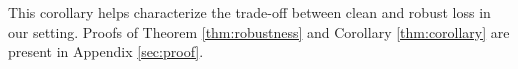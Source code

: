 This corollary helps characterize the trade-off between clean and robust loss in our setting. Proofs of Theorem \ref{thm:robustness} and Corollary \ref{thm:corollary} are present in Appendix \ref{sec:proof}.



